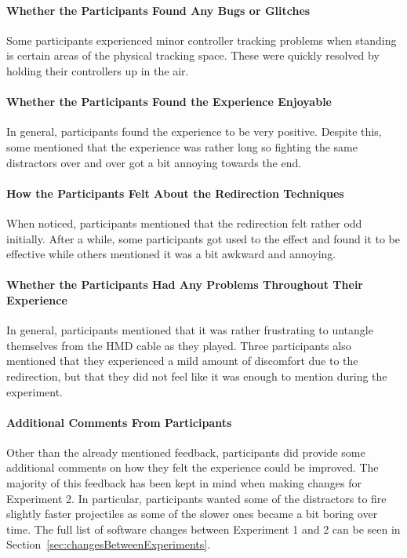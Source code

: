 \paragraph{Whether the Participants Found Any Bugs or Glitches}
Some participants experienced minor controller tracking problems when standing is certain areas of the physical tracking space. These were quickly resolved by holding their controllers up in the air. 

\paragraph{Whether the Participants Found the Experience Enjoyable}
In general, participants found the experience to be very positive. Despite this, some mentioned that the experience was rather long so fighting the same distractors over and over got a bit annoying towards the end.

\paragraph{How the Participants Felt About the Redirection Techniques}
When noticed, participants mentioned that the redirection felt rather odd initially. After a while, some participants got used to the effect and found it to be effective while others mentioned it was a bit awkward and annoying. 

\paragraph{Whether the Participants Had Any Problems Throughout Their Experience}
In general, participants mentioned that it was rather frustrating to untangle themselves from the HMD cable as they played. Three participants also mentioned that they experienced a mild amount of discomfort due to the redirection, but that they did not feel like it was enough to mention during the experiment. 

\paragraph{Additional Comments From Participants}
Other than the already mentioned feedback, participants did provide some additional comments on how they felt the experience could be improved. The majority of this feedback has been kept in mind when making changes for Experiment 2. In particular, participants wanted some of the distractors to fire slightly faster projectiles as some of the slower ones became a bit boring over time. The full list of software changes between Experiment 1 and 2 can be seen in Section~\ref{sec:changesBetweenExperiments}.

